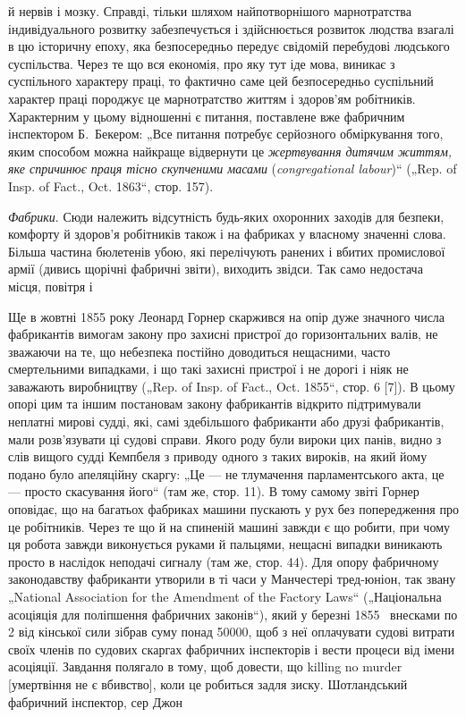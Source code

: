 \parcont{}  %
й нервів і мозку. Справді, тільки шляхом найпотворнішого марнотратства індивідуального розвитку
забезпечується і здійснюється
розвиток людства взагалі в цю історичну епоху, яка безпосередньо передує свідомій перебудові
людського суспільства. Через те що вся економія, про яку тут іде мова, виникає з суспільного
характеру праці, то фактично саме цей безпосередньо
суспільний характер праці породжує це марнотратство життям і
здоров’ям робітників. Характерним у цьому відношенні є питання,
поставлене вже фабричним інспектором Б.~Бекером: „Все питання потребує серйозного обміркування того,
яким способом
можна найкраще відвернути це \emph{жертвування дитячим життям,
яке спричинює праця тісно скупченими масами} (\emph{congregational
labour})“ („Rep. of Insp. of Fact., Oct. 1863“, стор. 157).

\emph{Фабрики}. Сюди належить відсутність будь-яких охоронних
заходів для безпеки, комфорту й здоров’я робітників також і на
фабриках у власному значенні слова. Більша частина бюлетенів
убою, які перелічують ранених і вбитих промислової армії (дивись щорічні фабричні звіти), виходить
звідси. Так само недостача місця, повітря і~

Ще в жовтні 1855 року Леонард Горнер скаржився на опір
дуже значного числа фабрикантів вимогам закону про захисні
пристрої до горизонтальних валів, не зважаючи на те, що небезпека постійно доводиться нещасними,
часто смертельними
випадками, і що такі захисні пристрої і не дорогі і ніяк не заважають виробництву („Rep. of Insp. of
Fact., Oct. 1855“, стор. 6 [7]).
В цьому опорі цим та іншим постановам закону фабрикантів
відкрито підтримували неплатні мирові судді, які, самі здебільшого фабриканти або друзі
фабрикантів, мали розв’язувати ці судові справи. Якого роду були вироки цих панів,
видно з слів вищого судді Кемпбеля з приводу одного з таких
вироків, на який йому подано було апеляційну скаргу: „Це —
не тлумачення парламентського акта, це — просто скасування
його“ (там же, стор. 11). В тому самому звіті Горнер оповідає, що на багатьох фабриках машини
пускають у рух без
попередження про це робітників. Через те що й на спиненій
машині завжди є що робити, при чому ця робота завжди виконується руками й пальцями, нещасні випадки
виникають просто
в наслідок неподачі сигналу (там же, стор. 44). Для опору
фабричному законодавству фабриканти утворили в ті часи
у Манчестері тред-юніон, так звану „National Association for the
Amendment of the Factory Laws“ („Національна асоціяція для поліпшення фабричних законів“), який у
березні 1855~ внесками
по 2 від кінської сили зібрав суму понад \num{50000}, щоб з неї оплачувати судові витрати своїх членів
по судових скаргах фабричних інспекторів і вести процеси від
імени асоціяції. Завдання полягало в тому, щоб довести, що killing no murder [умертвіння не є
вбивство], коли це робиться
задля зиску. Шотландський фабричний інспектор, сер Джон
\parbreak{}  %
